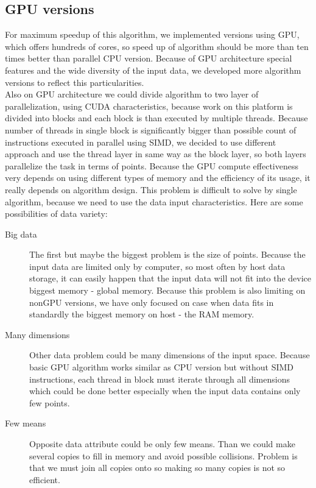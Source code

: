 \subsection{GPU versions}
For maximum speedup of this algorithm, we implemented versions using GPU, which offers hundreds of cores, so speed up of algorithm should be more than ten times better than parallel CPU version. Because of GPU architecture special features and the wide diversity of the input data, we developed more algorithm versions to reflect this particularities.\\
Also on GPU architecture we could divide algorithm to two layer of parallelization, using CUDA characteristics, because work on this platform is divided into blocks and each block is than executed by multiple threads. Because number of threads in single block is significantly bigger than possible count of instructions executed in parallel using SIMD, we decided to use different approach and use the thread layer in same way as the block layer, so both layers parallelize the task in terms of points.
Because the GPU compute effectiveness very depends on using different types of memory and the efficiency of its usage, it really depends on algorithm design. This problem is difficult to solve by single algorithm, because we need to use the data input characteristics. Here are some possibilities of data variety:
\begin{description}
\item[Big data] The first but maybe the biggest problem is the size of points. Because the input data are limited only by computer, so most often by host data storage, it can easily happen that the input data will not fit into the device biggest memory - global memory. Because this problem is also limiting on nonGPU versions, we have only focused on case when data fits in standardly the biggest memory on host - the RAM memory.
\item[Many dimensions] Other data problem could be many dimensions of the input space. Because basic GPU algorithm works similar as CPU version but without SIMD instructions, each thread in block must iterate through all dimensions which could be done better especially when the input data contains only few points.
\item[Few means] Opposite data attribute could be only few means. Than we could make several copies to fill in memory and avoid possible collisions. Problem is that we must join all copies onto so making so many copies is not so efficient.
\end{description}

